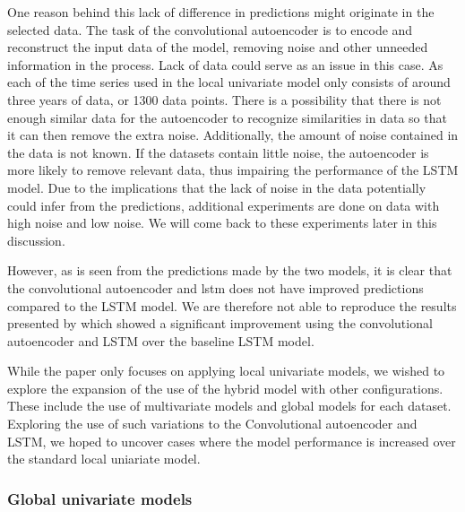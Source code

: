 One reason behind this lack of difference in predictions might originate in the selected data.
The task of the convolutional autoencoder is to encode and reconstruct the input data of the model, 
removing noise and other unneeded information in the process.
Lack of data could serve as an issue in this case.
As each of the time series used in the local univariate model only consists of around three years of data, or 1300 data points.
There is a possibility that there is not enough similar data for the autoencoder to recognize similarities in data
so that it can then remove the extra noise.
Additionally, the amount of noise contained in the data is not known.
If the datasets contain little noise, the autoencoder is more likely to remove relevant data, thus impairing the performance of the LSTM model.
Due to the implications that the lack of noise in the data potentially could infer from the predictions,
additional experiments are done on data with high noise and low noise.
We will come back to these experiments later in this discussion.

However, as is seen from the predictions made by the two models, it is clear that the convolutional autoencoder and lstm
does not have improved predictions compared to the LSTM model.
We are therefore not able to reproduce the results presented by \cite{Zhao2019}
which showed a significant improvement using the convolutional autoencoder and LSTM over the baseline LSTM model.



While the paper \cite{Zhao2019} only focuses on applying local univariate models,
we wished to explore the expansion of the use of the hybrid model with other configurations.
These include the use of multivariate models and global models for each dataset.
Exploring the use of such variations to the Convolutional autoencoder and LSTM,
we hoped to uncover cases where the model performance is increased over the standard local uniariate model.



\subsubsection{Global univariate models}


